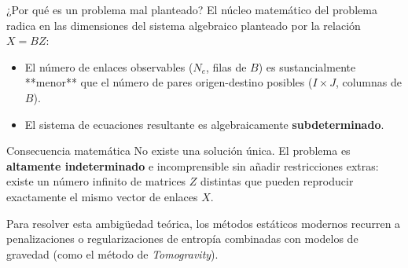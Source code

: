 \documentclass[10pt]{beamer}
\begin{document}
    \begin{frame}{¿Por qué es un problema mal planteado?}
        \justifying
        El núcleo matemático del problema radica en las dimensiones del sistema algebraico planteado por la relación $X = BZ$:
        
        \begin{itemize}
            \item El número de enlaces observables ($N_e$, filas de $B$) es sustancialmente **menor** que el número de pares origen-destino posibles ($I \times J$, columnas de $B$).
            \item El sistema de ecuaciones resultante es algebraicamente \textbf{subdeterminado}.
        \end{itemize}

        \begin{alertblock}{Consecuencia matemática}
            No existe una solución única. El problema es \textbf{altamente indeterminado} e incomprensible sin añadir restricciones extras: existe un número infinito de matrices $Z$ distintas que pueden reproducir exactamente el mismo vector de enlaces $X$.
        \end{alertblock}
        \small Para resolver esta ambigüedad teórica, los métodos estáticos modernos recurren a penalizaciones o regularizaciones de entropía combinadas con modelos de gravedad (como el método de \textit{Tomogravity}).
    \end{frame}
\end{document}
